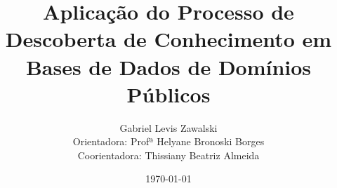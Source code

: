 \documentclass[xcolor=table]{beamer}
\title[Defesa de Proposta de TCC]{Aplicação do Processo de Descoberta de Conhecimento em Bases de Dados de Domínios Públicos} %
\author[Gabriel]{
Gabriel Levis Zawalski\\ \footnotesize Orientadora: Profª Helyane Bronoski Borges \\ \footnotesize Coorientadora: Thissiany Beatriz Almeida
} %
\institute[UTFPR] %
{
Universidade Tecnológica Federal do Paraná\\ %
\medskip
\textit{gabrielzawalski@gmail.com} \\ %
\medskip
\url{https://github.com/glzawalski/} 
}
\date{\today} %
\begin{document}
\begin{frame}
\titlepage %
\end{frame}











\section*{}
\begin{frame}
\titlepage
\end{frame}

\end{document}
